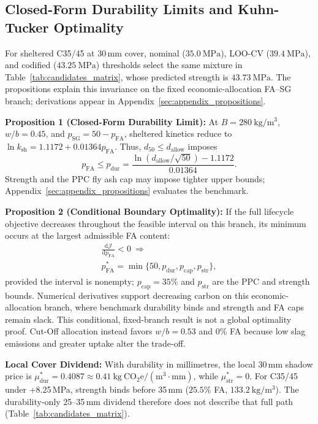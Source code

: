\documentclass[journal]{IEEEtran}
\begin{document}
\subsection{Closed-Form Durability Limits and Kuhn-Tucker Optimality}
For sheltered C35/45 at 30\,mm cover, nominal ($35.0\ \mathrm{MPa}$), LOO-CV ($39.4\ \mathrm{MPa}$), and codified ($43.25\ \mathrm{MPa}$) thresholds select the same mixture in Table~\ref{tab:candidates_matrix}, whose predicted strength is $43.73\ \mathrm{MPa}$. The propositions explain this invariance on the fixed economic-allocation FA--SG branch; derivations appear in Appendix~\ref{sec:appendix_propositions}.

\noindent\textbf{Proposition 1 (Closed-Form Durability Limit):}
At $B=280\ \mathrm{kg/m^3}$, $w/b=0.45$, and $p_{\mathrm{SG}}=50-p_{\mathrm{FA}}$, sheltered kinetics reduce to $\ln k_{\mathrm{sh}}=1.1172+0.01364p_{\mathrm{FA}}$. Thus, $d_{50}\le d_{\mathrm{allow}}$ imposes
\begin{equation}
p_{\mathrm{FA}}\le p_{\mathrm{dur}}
=\frac{\ln(d_{\mathrm{allow}}/\sqrt{50})-1.1172}{0.01364}.
\label{eq:prop_durability_bound}
\end{equation}
Strength and the PPC fly ash cap may impose tighter upper bounds; Appendix~\ref{sec:appendix_propositions} evaluates the benchmark.

\noindent\textbf{Proposition 2 (Conditional Boundary Optimality):}
If the full lifecycle objective decreases throughout the feasible interval on this branch, its minimum occurs at the largest admissible FA content:
\begin{equation}
\begin{gathered}
\frac{\mathrm d\mathcal J}{\mathrm dp_{\mathrm{FA}}}<0
\ \Longrightarrow\ \\
p_{\mathrm{FA}}^*=\min\{50,p_{\mathrm{dur}},p_{\mathrm{cap}},p_{\mathrm{str}}\},
\end{gathered}
\label{eq:prop_boundary_optimum}
\end{equation}
provided the interval is nonempty; $p_{\mathrm{cap}}=35\%$ and $p_{\mathrm{str}}$ are the PPC and strength bounds. Numerical derivatives support decreasing carbon on this economic-allocation branch, where benchmark durability binds and strength and FA caps remain slack. This conditional, fixed-branch result is not a global optimality proof. Cut-Off allocation instead favors $w/b=0.53$ and $0\%$ FA because low slag emissions and greater uptake alter the trade-off.

\noindent\textbf{Local Cover Dividend:}
With durability in millimetres, the local 30\,mm shadow price is $\mu_{\mathrm{dur}}^*=0.4087\approx0.41\ \mathrm{kg\ CO_2e/(m^3\cdot mm)}$, while $\mu_{\mathrm{str}}^*=0$. For C35/45 under +8.25\,MPa, strength binds before 35\,mm ($25.5\%$ FA, $133.2\ \mathrm{kg/m^3}$). The durability-only 25--35\,mm dividend therefore does not describe that full path (Table~\ref{tab:candidates_matrix}).
\end{document}
